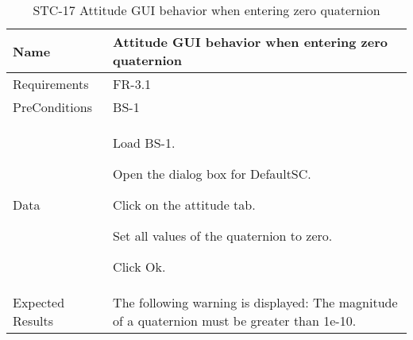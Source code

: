 
\begin{table}[htbp!]
\centering
      \begin{tabular}{|p{1.05 in} |p{4.75 in} |}
      \hline
         \rowcolor[rgb]{0.8,0.8,0.8} Name & Attitude GUI behavior when entering zero quaternion\\
         \hline
         Requirements & FR-3.1\\  \hline
         PreConditions & BS-1\\     \hline
         Data &
         \begin{compactenum}
             \item Load BS-1.
             \item Open the dialog box for DefaultSC.
             \item Click on the attitude tab.
             \item Set all values of the quaternion to zero.
             \item Click Ok.
         \end{compactenum}
         \\ \hline
         Expected Results & The following warning is displayed:  The magnitude of a quaternion must be greater than 1e-10.\\
      \hline
      \end{tabular}
      \label{Table:STC-17}
      \caption{STC-17 Attitude GUI behavior when entering zero quaternion}
\end{table} 